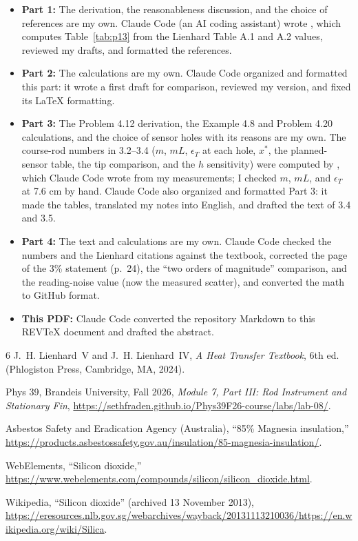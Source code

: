 \documentclass[reprint, amsmath, amssymb, aps, prl]{revtex4-2}
\begin{document}
\begin{itemize}
\item \textbf{Part 1:} The derivation, the reasonableness discussion, and the choice of
references are my own. Claude Code (an AI coding assistant) wrote
, which computes Table~\ref{tab:p13} from the
Lienhard Table A.1 and A.2 values, reviewed my drafts, and formatted the references.
\item \textbf{Part 2:} The calculations are my own. Claude Code organized and formatted
this part: it wrote a first draft for comparison, reviewed my version, and fixed its
LaTeX formatting.
\item \textbf{Part 3:} The Problem 4.12 derivation, the Example 4.8 and Problem 4.20
calculations, and the choice of sensor holes with its reasons are my own. The course-rod
numbers in 3.2--3.4 ($m$, $mL$, $\epsilon_T$ at each hole, $x^{\ast}$, the
planned-sensor table, the tip comparison, and the $h$ sensitivity) were computed by
, which Claude Code wrote from my
measurements; I checked $m$, $mL$, and $\epsilon_T$ at 7.6 cm by hand. Claude Code also
organized and formatted Part 3: it made the tables, translated my notes into English, and
drafted the text of 3.4 and 3.5.
\item \textbf{Part 4:} The text and calculations are my own. Claude Code checked the
numbers and the Lienhard citations against the textbook, corrected the page of the 3\%
statement (p.~24), the ``two orders of magnitude'' comparison, and the reading-noise value
(now the measured scatter), and converted the math to GitHub format.
\item \textbf{This PDF:} Claude Code converted the repository Markdown to this REVTeX
document and drafted the abstract.
\end{itemize}

\begin{thebibliography}{6}
J.~H. Lienhard~V and J.~H. Lienhard~IV, \emph{A Heat Transfer Textbook}, 6th ed.
(Phlogiston Press, Cambridge, MA, 2024).

Phys 39, Brandeis University, Fall 2026, \emph{Module 7, Part III: Rod Instrument and
Stationary Fin}, \url{https://sethfraden.github.io/Phys39F26-course/labs/lab-08/}.

Asbestos Safety and Eradication Agency (Australia), ``85\% Magnesia insulation,''
\url{https://products.asbestossafety.gov.au/insulation/85-magnesia-insulation/}.

WebElements, ``Silicon dioxide,''
\url{https://www.webelements.com/compounds/silicon/silicon_dioxide.html}.

Wikipedia, ``Silicon dioxide'' (archived 13 November 2013),
\url{https://eresources.nlb.gov.sg/webarchives/wayback/20131113210036/https://en.wikipedia.org/wiki/Silica}.
\end{thebibliography}
\end{document}

